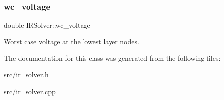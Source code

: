\subsubsection{\texorpdfstring{wc\+\_\+voltage}{wc\_voltage}}
{\footnotesize\ttfamily double I\+R\+Solver\+::wc\+\_\+voltage}



Worst case voltage at the lowest layer nodes. 



The documentation for this class was generated from the following files\+:\begin{DoxyCompactItemize}
\item 
src/\hyperlink{ir__solver_8h}{ir\+\_\+solver.\+h}\item 
src/\hyperlink{ir__solver_8cpp}{ir\+\_\+solver.\+cpp}\end{DoxyCompactItemize}
